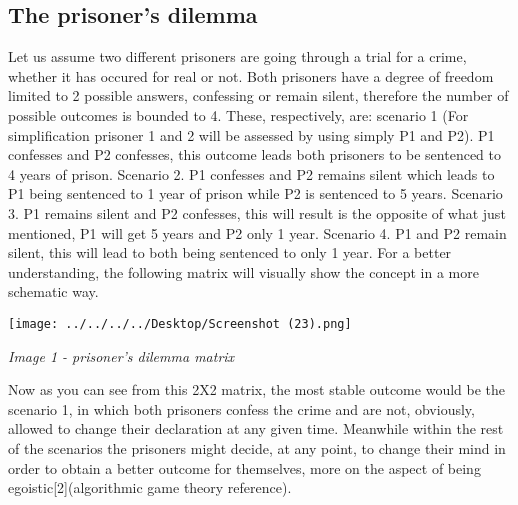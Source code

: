 \documentclass[conference]{IEEEtran}
\begin{document}
\subsection{The prisoner's dilemma}
Let us assume two different prisoners are going through a trial for a crime, whether it has occured for real or not. Both prisoners have a degree of freedom limited to 2 possible answers, confessing or remain silent, therefore the number of possible outcomes is bounded to 4. These, respectively, are: scenario 1 (For simplification prisoner 1 and 2 will be assessed by using simply P1 and P2). P1 confesses and P2 confesses, this outcome leads both prisoners to be sentenced to 4 years of prison. Scenario 2. P1 confesses and P2 remains silent which leads to P1 being sentenced to 1 year of prison while P2 is sentenced to 5 years. Scenario 3. P1 remains silent and P2 confesses, this will result is the opposite of what just mentioned, P1 will get 5 years and P2 only 1 year. Scenario 4. P1 and P2 remain silent, this will lead to both being sentenced to only 1 year. For a better understanding, the following matrix will visually show the concept in a more schematic way.
\centerline{\texttt{[image: ../../../../Desktop/Screenshot (23).png]}}  
\centerline{\textit{Image 1 - prisoner's dilemma matrix}}

Now as you can see from this 2X2 matrix, the most stable outcome would be the scenario 1, in which both prisoners confess the crime and are not, obviously, allowed to change their declaration at any given time. Meanwhile within the rest of the scenarios the prisoners might decide, at any point, to change their mind in order to obtain a better outcome for themselves, more on the aspect of being egoistic[2](algorithmic game theory reference).
\end{document}
